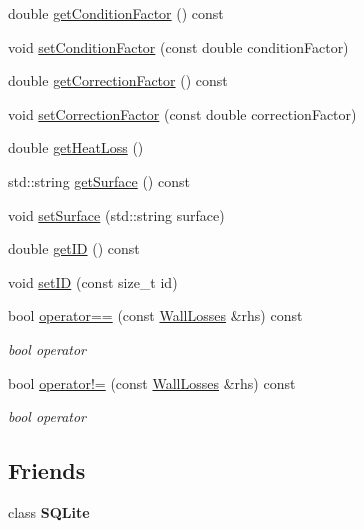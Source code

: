 \begin{DoxyCompactItemize}
\item 
double \hyperlink{class_wall_losses_a16ab4003a17f9e95f28b9390b92c2b27}{get\+Condition\+Factor} () const
\item 
void \hyperlink{class_wall_losses_a1533a7513460d22f433fb670700573a2}{set\+Condition\+Factor} (const double condition\+Factor)
\item 
double \hyperlink{class_wall_losses_a4ce6a0ec36cd868b14b041f18251cb6d}{get\+Correction\+Factor} () const
\item 
void \hyperlink{class_wall_losses_affdf3f6c3d54d73c7f91e1515fb12533}{set\+Correction\+Factor} (const double correction\+Factor)
\item 
double \hyperlink{class_wall_losses_a884da3507498878f619cbe5ba340c0ef}{get\+Heat\+Loss} ()
\item 
std\+::string \hyperlink{class_wall_losses_a10f5de20dc6fead726adbf62a9c49b09}{get\+Surface} () const
\item 
void \hyperlink{class_wall_losses_af329a27b78e1f2d84af6a48ffc59bfad}{set\+Surface} (std\+::string surface)
\item 
double \hyperlink{class_wall_losses_ad67b46094ba89cb759ec124c63c137de}{get\+ID} () const
\item 
void \hyperlink{class_wall_losses_a91526efc0eb1bf030ebc1d864a21acdd}{set\+ID} (const size\+\_\+t id)
\item 
\mbox{\label{class_wall_losses_ad9eebb34927690332c00df51507878e9}} 
bool \hyperlink{class_wall_losses_ad9eebb34927690332c00df51507878e9}{operator==} (const \hyperlink{class_wall_losses}{Wall\+Losses} \&rhs) const
\begin{DoxyCompactList}\small\item\em bool operator \end{DoxyCompactList}\item 
\mbox{\label{class_wall_losses_a46d50205e67870978292c4bfa1c9d329}} 
bool \hyperlink{class_wall_losses_a46d50205e67870978292c4bfa1c9d329}{operator!=} (const \hyperlink{class_wall_losses}{Wall\+Losses} \&rhs) const
\begin{DoxyCompactList}\small\item\em bool operator \end{DoxyCompactList}\end{DoxyCompactItemize}
\subsection*{Friends}
\begin{DoxyCompactItemize}
\item 
\mbox{\label{class_wall_losses_ac7d22f3ca36435f73d55df60dc799e14}} 
class {\bfseries S\+Q\+Lite}
\end{DoxyCompactItemize}


